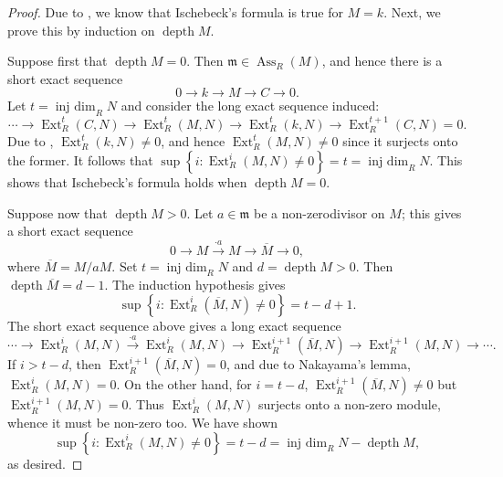 \documentclass[10pt]{article}
\theoremstyle{thmstyle}
\theoremstyle{defstyle}
\newcommand{\frakm}{\mathfrak{m}} %
\newcommand{\Ext}{\operatorname{Ext}}
\newcommand{\Ass}{\operatorname{Ass}}
\newcommand{\injdim}{\operatorname{inj~dim}}
\newcommand{\depth}{\operatorname{depth}}
\begin{document}
\begin{proof}
    Due to , we know that Ischebeck's formula is true for $M = k$. Next, we prove this by induction on $\depth M$.

    Suppose first that $\depth M = 0$. Then $\frakm\in\Ass_R(M)$, and hence there is a short exact sequence
    \begin{equation*}
        0\longrightarrow k\longrightarrow M\longrightarrow C\longrightarrow 0.
    \end{equation*}
    Let $t = \injdim_R N$ and consider the long exact sequence induced:
    \begin{equation*}
        \cdots\to\Ext^t_R(C, N)\to\Ext^t_R(M, N)\to\Ext^t_R(k, N)\to \Ext^{t + 1}_R(C, N) = 0.
    \end{equation*}
    Due to , $\Ext^t_R(k, N)\ne 0$, and hence $\Ext^t_R(M, N)\ne 0$ since it surjects onto the former. It follows that $\sup\left\{i\colon\Ext^i_R(M, N)\ne 0\right\} = t = \injdim_R N$. This shows that Ischebeck's formula holds when $\depth M = 0$. 

    Suppose now that $\depth M > 0$. Let $a\in\frakm$ be a non-zerodivisor on $M$; this gives a short exact sequence 
    \begin{equation*}
        0\to M\xrightarrow{\cdot a} M\to\overline M\to 0,
    \end{equation*}
    where $\overline M = M/aM$. Set $t = \injdim_R N$ and $d = \depth M > 0$. Then $\depth\overline M = d - 1$. The induction hypothesis gives 
    \begin{equation*}
        \sup\left\{i\colon\Ext^i_R(\overline M, N)\ne 0\right\} = t - d + 1.
    \end{equation*}
    The short exact sequence above gives a long exact sequence
    \begin{equation*}
        \cdots\to\Ext^i_R(M, N)\xrightarrow{\cdot a}\Ext^i_R(M, N)\to\Ext^{i + 1}_R(\overline M, N)\to\Ext^{i + 1}_R(M, N)\to\cdots.
    \end{equation*}
    If $i > t - d$, then $\Ext^{i + 1}_R(\overline M, N) = 0$, and due to Nakayama's lemma, $\Ext^i_R(M, N) = 0$. On the other hand, for $i = t -d$, $\Ext^{i + 1}_R(\overline M, N)\ne 0$ but $\Ext^{i + 1}_R(M, N) = 0$. Thus $\Ext^i_R(M, N)$ surjects onto a non-zero module, whence it must be non-zero too. We have shown 
    \begin{equation*}
        \sup\left\{i\colon\Ext^i_R(M, N)\ne 0\right\} = t - d = \injdim_R N - \depth M, 
    \end{equation*}
    as desired.
\end{proof}
\end{document}
